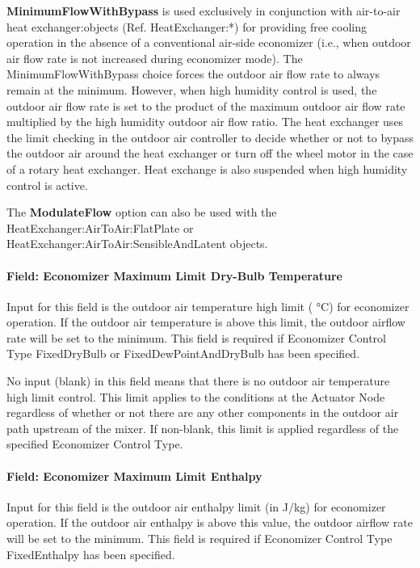 \textbf{MinimumFlowWithBypass} is used exclusively in conjunction with air-to-air heat exchanger:objects (Ref. HeatExchanger:*) for providing free cooling operation in the absence of a conventional air-side economizer (i.e., when outdoor air flow rate is not increased during economizer mode). The MinimumFlowWithBypass choice forces the outdoor air flow rate to always remain at the minimum. However, when high humidity control is used, the outdoor air flow rate is set to the product of the maximum outdoor air flow rate multiplied by the high humidity outdoor air flow ratio. The heat exchanger uses the limit checking in the outdoor air controller to decide whether or not to bypass the outdoor air around the heat exchanger or turn off the wheel motor in the case of a rotary heat exchanger. Heat exchange is also suspended when high humidity control is active.

The \textbf{ModulateFlow} option can also be used with the HeatExchanger:AirToAir:FlatPlate or HeatExchanger:AirToAir:SensibleAndLatent objects.

\paragraph{Field: Economizer Maximum Limit Dry-Bulb Temperature}\label{field-economizer-maximum-limit-dry-bulb-temperature}

Input for this field is the outdoor air temperature high limit ( °C) for economizer operation. If the outdoor air temperature is above this limit, the outdoor airflow rate will be set to the minimum. This field is required if Economizer Control Type FixedDryBulb or FixedDewPointAndDryBulb has been specified.

No input (blank) in this field means that there is no outdoor air temperature high limit control. This limit applies to the conditions at the Actuator Node regardless of whether or not there are any other components in the outdoor air path upstream of the mixer. If non-blank, this limit is applied regardless of the specified Economizer Control Type.

\paragraph{Field: Economizer Maximum Limit Enthalpy}\label{field-economizer-maximum-limit-enthalpy}

Input for this field is the outdoor air enthalpy limit (in J/kg) for economizer operation. If the outdoor air enthalpy is above this value, the outdoor airflow rate will be set to the minimum. This field is required if Economizer Control Type FixedEnthalpy has been specified.

